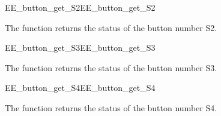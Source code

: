 \begin{function_nopb2}{EE\_button\_get\_S2}{EE_button_get_S2}
  
  \begin{fundescription}
    The function returns the status of the button number S2.
  \end{fundescription}
  
  
  \begin{funreturn}
  \end{funreturn}
  
\end{function_nopb2}

\begin{function_nopb2}{EE\_button\_get\_S3}{EE_button_get_S3}
  
  \begin{fundescription}
    The function returns the status of the button number S3.
  \end{fundescription}
  
  
  \begin{funreturn}
  \end{funreturn}
  
\end{function_nopb2}

\begin{function_nopb2}{EE\_button\_get\_S4}{EE_button_get_S4}
  
  \begin{fundescription}
    The function returns the status of the button number S4.
  \end{fundescription}
  
  
  \begin{funreturn}
  \end{funreturn}
  
\end{function_nopb2}

